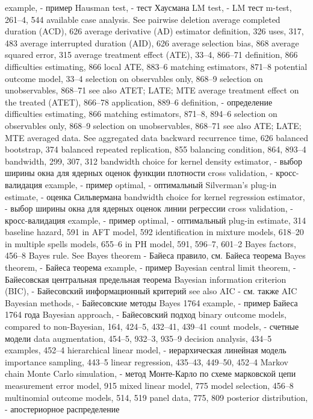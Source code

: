 example, - пример 
Hausman test, - тест Хаусмана
LM test, - LM тест 
m-test, 261–4, 544
available case analysis. See pairwise deletion average completed duration (ACD), 626 average derivative (AD) estimator
definition, 326
uses, 317, 483
average interrupted duration (AID), 626 average selection bias, 868
average squared error, 315
average treatment effect (ATE), 33–4, 866–71
definition, 866
difficulties estimating, 866
local ATE, 883–6
matching estimators, 871–8 potential outcome model, 33–4 selection on observables only, 868–9 selection on unobservables, 868–71 see also ATET; LATE; MTE
average treatment effect on the treated (ATET), 866–78
application, 889–6
definition, - определение
difficulties estimating, 866
matching estimators, 871–8, 894–6 selection on observables only, 868–9 selection on unobservables, 868–71 see also ATE; LATE; MTE
averaged data. See aggregated data
backward recurrence time, 626
balanced bootstrap, 374
balanced repeated replication, 855
balancing condition, 864, 893–4
bandwidth, 299, 307, 312
bandwidth choice for kernel density estimator, - выбор ширины окна для ядерных оценок функции плотности
cross validation, - кросс-валидация
example, - пример
optimal, - оптимальный
Silverman’s plug-in estimate, - оценка Сильвермана
bandwidth choice for kernel regression estimator, - выбор ширины окна для ядерных оценок линии регрессии
cross validation, - кросс-валидация 
example, - пример 
optimal, - оптимальный 
plug-in estimate, 314
baseline hazard, 591
in AFT model, 592
identification in mixture models, 618–20 in multiple spells models, 655–6
in PH model, 591, 596–7, 601–2
Bayes factors, 456–8
Bayes rule. See Bayes theorem - Байеса правило, см. Байеса теорема
Bayes theorem, - Байеса теорема 
example, - пример
Bayesian central limit theorem, - Байесовская центральная предельная теорема
Bayesian information criterion (BIC), - Байесовский информационный критерий
see also AIC - см. также AIC
Bayesian methods, - Байесовские методы
Bayes 1764 example, - пример Байеса 1764 года
Bayesian approach, - Байесовский подход
binary outcome models, 
compared to non-Bayesian, 164, 424–5, 432–41,
439–41
count models, - счетные модели
data augmentation, 454–5, 932–3, 935–9 decision analysis, 434–5
examples, 452–4
hierarchical linear model, - иерархическая линейная модель
importance sampling, 443–5
linear regression, 435–43, 449–50, 452–4 
Markov chain Monte Carlo simulation, - метод Монте-Карло по схеме марковской цепи
measurement error model, 915
mixed linear model, 775
model selection, 456–8
multinomial outcome models, 514, 519 panel data, 775, 809
posterior distribution, - апостериорное распределение
